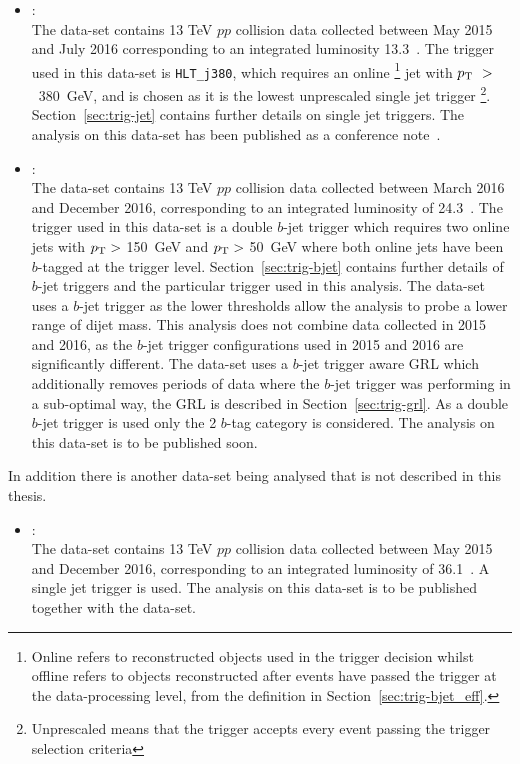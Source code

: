 \begin{itemize}[leftmargin=*]
\item\textbf{\summer{}}: \\
  The \summer{} data-set contains 13 TeV $pp$ collision data collected
  between May 2015 and July 2016 corresponding to an integrated luminosity 13.3~\ifb.
  The trigger used in this data-set is \verb|HLT_j380|,
  which requires an online \footnote{Online refers to
    reconstructed objects used in the trigger decision
  whilst offline refers to objects reconstructed after events have passed the trigger at the data-processing level,
  from the definition in Section~\ref{sec:trig-bjet_eff}.}  jet with $p_{\mathrm{T}}~>$~380~GeV, 
  and is chosen as it is the lowest unprescaled single jet trigger \footnote{Unprescaled means that the trigger accepts every event passing the trigger selection criteria}.
  Section~\ref{sec:trig-jet} contains further details on single jet triggers.
  The analysis on this data-set has been published as a conference note~\cite{dibjet-ichep_conf}. \\
  
\item\textbf{\lm{}}: \\
  The \lm{} data-set contains 13 TeV $pp$ collision data collected
  between March 2016 and December 2016, corresponding to an integrated luminosity of 24.3~\ifb.
  The trigger used in this data-set is a double $b$-jet trigger 
  which requires two online jets with $p_{\mathrm{T}} >$ 150~GeV and $p_{\mathrm{T}} >$ 50~GeV
  where both online jets have been $b$-tagged at the trigger level.
  Section~\ref{sec:trig-bjet} contains further details of $b$-jet triggers and the particular trigger used in this analysis.
  The \lm{} data-set uses a $b$-jet trigger as the lower \pT{} thresholds allow
  the analysis to probe a lower range of dijet mass.
  This analysis does not combine data collected in 2015 and 2016, as the $b$-jet trigger configurations used in 2015 and 2016 are significantly different.
  The \lm{} data-set uses a $b$-jet trigger aware GRL which additionally
  removes periods of data where the $b$-jet trigger was performing in a sub-optimal way,
  the GRL is described in Section~\ref{sec:trig-grl}.
  As a double $b$-jet trigger is used only the 2 $b$-tag category is considered.
  The analysis on this data-set is to be published soon.
\end{itemize}

\noindent
In addition there is another data-set being analysed that is not described in this thesis.
\vspace{-0.5em}
\begin{itemize}[leftmargin=*]
\item\textbf{\hm{}}:\\
  The \hm{} data-set contains 13 TeV $pp$ collision data collected
  between May 2015 and December 2016, corresponding to an integrated luminosity of 36.1~\ifb.
  A single jet trigger is used.
  The analysis on this data-set is to be published together with the \lm{} data-set.
\end{itemize}
\vspace{-1em}

